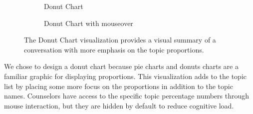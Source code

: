 \begin{figure}[h]
  \centering
    \begin{subfigure}[h]{0.75\textwidth}
      \caption{Donut Chart}
      \label{donutchart}
      \vspace{3mm}
    \end{subfigure}
    \begin{subfigure}[h]{0.75\textwidth}
      \caption{Donut Chart with mouseover}
      \label{donutpopout}
    \end{subfigure}
  \caption{The Donut Chart visualization provides a visual summary of a conversation
  with more emphasis on the topic proportions.}
\end{figure}

We chose to design a donut chart because pie charts and donuts charts are a
familiar graphic for displaying proportions. This visualization adds to the topic list by
placing some more focus on the proportions in addition to the topic names. Counselors
have access to the specific topic percentage numbers through mouse interaction, but
they are hidden by default to reduce cognitive load.

